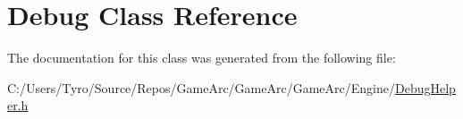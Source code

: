 \hypertarget{class_debug}{}\section{Debug Class Reference}
\label{class_debug}


The documentation for this class was generated from the following file\+:\begin{DoxyCompactItemize}
\item 
C\+:/\+Users/\+Tyro/\+Source/\+Repos/\+Game\+Arc/\+Game\+Arc/\+Game\+Arc/\+Engine/\mbox{\hyperlink{_debug_helper_8h}{Debug\+Helper.\+h}}\end{DoxyCompactItemize}
